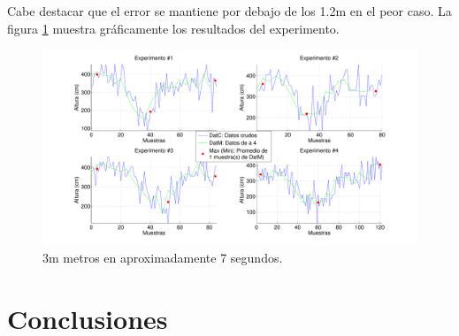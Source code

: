 \documentclass[main]{subfiles}
\begin{document}
Cabe destacar que el error se mantiene por debajo de los 1.2m en el peor caso. La figura \ref{fig:estante_veloz.pdf} muestra gr\'aficamente los resultados del experimento.

\begin{figure}[H]
\hspace{-25pt}
  \includegraphics[width=1.1\textwidth]{./pics_barom/estante_veloz.pdf}
  \caption{3m metros en aproximadamente 7 segundos.}
  \label{fig:estante_veloz.pdf}
\end{figure}

\section{Conclusiones}
\label{sec:conclusiones}
\end{document}

